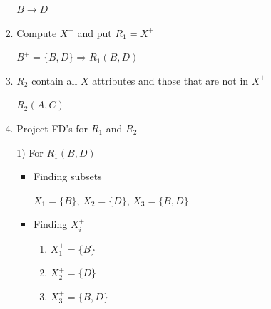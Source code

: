 \documentclass[12pt]{article}
\begin{document}
\begin{enumerate}[1.]
\begin{itemize}
\begin{itemize}
\begin{enumerate}[1.]
                \bigskip

                \color{red}
                $B \to D$
                \color{black}

                \bigskip

                \item Compute $X^+$ and put $R_1 = X^+$

                \bigskip

                \color{red}
                $B^+ = \{B,D\} \Rightarrow R_1(B,D)$
                \color{black}

                \bigskip

                \item $R_2$ contain all $X$ attributes and those that are not in $X^+$

                \bigskip

                \color{red}
                $R_2(A,C)$
                \color{black}

                \bigskip

                \item Project FD's for $R_1$ and $R_2$

                \bigskip


                1) \color{red}For $R_1(B,D)$\color{black}

                \bigskip

                \begin{itemize}
                    \item Finding subsets

                    \bigskip
                    \color{red}

                        $X_1 = \{B\}$,
                        $X_2 = \{D\}$,
                        $X_3 = \{B,D\}$

                    \color{black}
                    \bigskip

                    \item Finding $X_i^+$

                    \bigskip
                    \color{red}

                    \begin{enumerate}[1.]
                        \item $X_1^+ = \{B\}$
                        \item $X_2^+ = \{D\}$
                        \item $X_3^+ = \{B,D\}$
                    \end{enumerate}


\end{itemize}
\end{enumerate}
\end{itemize}
\end{itemize}
\end{enumerate}
\end{document}
